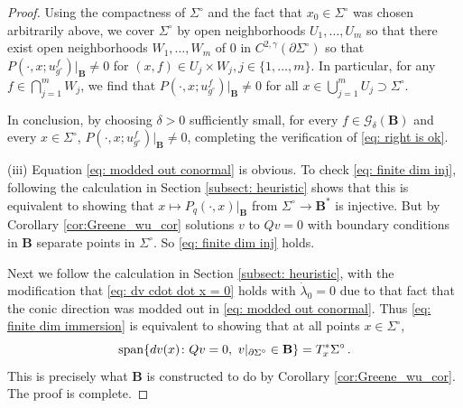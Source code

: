 \documentclass[11pt]{amsart}
\theoremstyle{definition}
\numberwithin{equation}{section}
\newcommand{\p}{\partial}
\newcommand{\BB}{\mathbf B}
\begin{document}
\begin{proof}
Using the compactness of $\Sigma^\circ$ and the fact that $x_0\in \Sigma^\circ$ was chosen arbitrarily above, we cover $\Sigma^\circ$ by open neighborhoods $U_1,\dots, U_m$ so that there exist open neighborhoods $W_1,\dots, W_m$ of $0$ in $C^{2,\gamma}(\p\Sigma^\circ)$ so that $P(\cdot, x; u^f_{g^\circ})\vert_\BB \neq 0$ for $(x,f)\in U_j\times W_j, j\in \{1,\dots, m\}$. In particular, for any $f \in \bigcap_{j=1}^m W_j$, we find that $P(\cdot, x; u^f_{g^\circ})\vert_\BB \neq 0$ for all $x\in \bigcup_{j=1}^m U_j \supset \Sigma^\circ$. 

In conclusion, by choosing $\delta>0$ sufficiently small, for every $f\in \mathcal{G}_\delta(\BB)$ and every $x\in\Sigma^\circ$, $P(\cdot,x;u^f_{g^\circ})\vert_\BB \neq 0$, completing the verification of \eqref{eq: right is ok}.

(iii) Equation \eqref{eq: modded out conormal} is obvious.
To check \eqref{eq: finite dim inj}, following the calculation in Section \ref{subsect: heuristic} shows that this is equivalent to showing that $x\mapsto P_q(\cdot, x)\vert_\BB$ from $\Sigma^\circ \to \BB^*$ is injective. But by Corollary \ref{cor:Greene_wu_cor} solutions $v$ to $Qv=0$ with boundary conditions in $\BB$ separate points in $\Sigma^\circ$. So \eqref{eq: finite dim inj} holds.

Next we follow the calculation in Section \ref{subsect: heuristic}, with the modification that \eqref{eq: dv cdot dot x = 0} holds with $\dot{\lambda}_0 = 0$ due to that fact that the conic direction was modded out in \eqref{eq: modded out conormal}. Thus \eqref{eq: finite dim immersion} is equivalent to showing that at all points $x\in \Sigma^\circ$, 
$${\rm span}\{dv(x) \colon Qv=0,\  v\vert_{\partial\Sigma^\circ} \in \BB \} = T^*_{x}\Sigma^\circ\,.$$
This is precisely what $\BB$ is constructed to do by Corollary \ref{cor:Greene_wu_cor}. The proof is complete.
\end{proof}
\end{document}
